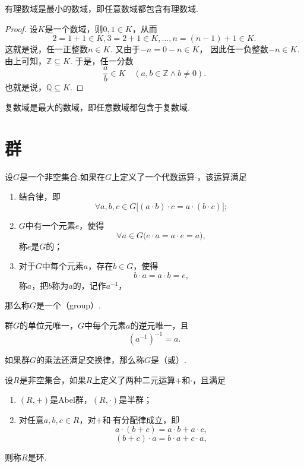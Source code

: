 \begin{theorem}
有理数域是最小的数域，即任意数域都包含有理数域.
\begin{proof}
设\(K\)是一个数域，则\(0,1 \in K\)，从而
\[
2 = 1 + 1 \in K,
3 = 2 + 1 \in K,
\dotsc,
n = (n-1) + 1 \in K.
\]
这就是说，任一正整数\(n \in K\).
又由于\(-n = 0 - n \in K\)，%
因此任一负整数\(-n \in K\).
由上可知，\(\mathbb{Z} \subseteq K\).
于是，任一分数\[
\frac{a}{b} \in K \quad(a,b\in\mathbb{Z} \land b\neq0).
\]
也就是说，\(\mathbb{Q} \subseteq K\).
\end{proof}
\end{theorem}

\begin{theorem}
复数域是最大的数域，即任意数域都包含于复数域.
\end{theorem}


\section{群}
\begin{definition}
设\(G\)是一个非空集合.如果在\(G\)上定义了一个代数运算\(\cdot\)，该运算满足
\begin{enumerate}
\item 结合律，即\[
\forall a,b,c \in G \bigl[ (a \cdot b) \cdot c = a \cdot (b \cdot c) \bigr];
\]
\item \(G\)中有一个元素\(e\)，使得\[
\forall a \in G \bigl( e \cdot a = a \cdot e = a \bigr),
\]称\(e\)是\(G\)的；
\item 对于\(G\)中每个元素\(a\)，存在\(b \in G\)，使得\[
b \cdot a = a \cdot b = e,
\]称\(a\)，把\(b\)称为\(a\)的，记作\(a^{-1}\)，%
\end{enumerate}
那么称\(G\)是一个（group）.
\end{definition}

\begin{property}
群\(G\)的单位元唯一，\(G\)中每个元素\(a\)的逆元唯一，且\[
(a^{-1})^{-1} = a.
\]
\end{property}

\begin{definition}
如果群\(G\)的乘法还满足交换律，那么称\(G\)是（或）.
\end{definition}

\begin{theorem}
设\(R\)是非空集合，如果\(R\)上定义了两种二元运算\(+\)和\(\cdot\)，且满足\begin{enumerate}
\item \((R,+)\)是Abel群，\((R,\cdot)\)是半群；
\item 对任意\(a,b,c \in R\)，对\(+\)和\(\cdot\)有分配律成立，即\[
a \cdot (b + c) = a \cdot b + a \cdot c,
\]\[
(b + c) \cdot a = b \cdot a + c \cdot a,
\]
\end{enumerate}则称\(R\)是环.
\end{theorem}
